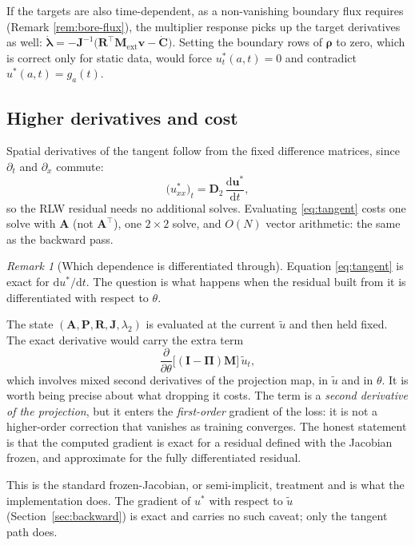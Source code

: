 \documentclass[11pt,a4paper]{article}
\theoremstyle{remark}
\newtheorem{remark}{Remark}
\newcommand{\ut}{\tilde{u}}
\newcommand{\us}{u^{*}}
\begin{document}
If the targets are also time-dependent, as a non-vanishing boundary flux
requires (Remark \ref{rem:bore-flux}), the multiplier response picks up the
target derivatives as well:
$\dot{\bm\lambda} = -\bm{J}^{-1}\big(\bm{R}^\top\bm{M}_{\mathrm{ext}}\bm v
- \dot{\bm{C}}\big)$. Setting the boundary
rows of $\bm\rho$ to zero, which is correct only for static data, would force
$\us_t(a,t) = 0$ and contradict $\us(a,t) = g_a(t)$.

\subsection{Higher derivatives and cost}

Spatial derivatives of the tangent follow from the fixed difference matrices,
since $\partial_t$ and $\partial_x$ commute:
\begin{equation}
\big(\us_{xx}\big)_t = \bm{D}_2\,\frac{\mathrm d\bm{\us}}{\mathrm dt},
\end{equation}
so the RLW residual needs no additional solves. Evaluating
\eqref{eq:tangent} costs one solve with $\bm{A}$ (not $\bm{A}^\top$), one
$2\times2$ solve, and $O(N)$ vector arithmetic: the same as the backward pass.

\begin{remark}[Which dependence is differentiated through]
\label{rem:frozen}
Equation \eqref{eq:tangent} is exact for $\mathrm d\us/\mathrm dt$. The question
is what happens when the residual built from it is differentiated with respect
to $\theta$.

The state $(\bm{A},\bm{P},\bm{R},\bm{J},\lambda_2)$ is evaluated at the current
$\ut$ and then held fixed. The exact derivative would carry the extra term
\begin{equation}
\frac{\partial}{\partial\theta}\Big[(\bm{I}-\bm\Pi)\bm{M}\Big]\,\ut_t ,
\end{equation}
which involves mixed second derivatives of the projection map, in $\ut$ and in
$\theta$. It is worth being precise about what dropping it costs. The term is a
\emph{second derivative of the projection}, but it enters the \emph{first-order}
gradient of the loss: it is not a higher-order correction that vanishes as
training converges. The honest statement is that the computed gradient is exact
for a residual defined with the Jacobian frozen, and approximate for the fully
differentiated residual.

This is the standard frozen-Jacobian, or semi-implicit, treatment and is what
the implementation does. The gradient of $\us$ with respect to $\ut$
(Section~\ref{sec:backward}) is exact and carries no such caveat; only the
tangent path does.
\end{remark}
\end{document}
